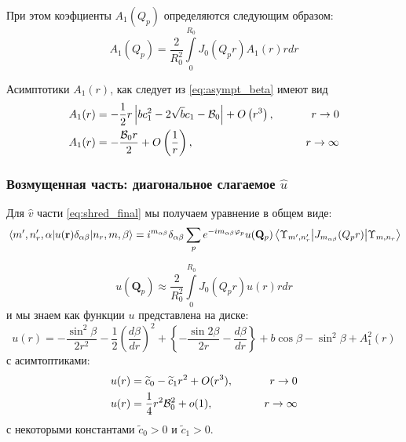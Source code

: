 \documentclass[a4paper,article,14pt]{extarticle}
\begin{document}
При этом коэфциенты $A_{1} (Q_p)$ определяются следующим образом:
\begin{equation}
\label{eq:fourier_v}
A_{1} (Q_p) = \frac{2}{R_0^2}  \int\limits_{0}^{R_0}  J_{0} (Q_p r ) A_1(r) r dr 
\end{equation} 

Асимптотики $A_1(r)$, как следует из \eqref{eq:asympt_beta} имеют вид
\begin{equation}
\begin{aligned}
A_1(r) &= -\frac{1}{2} r \left|b c_1^2-2 \sqrt{b} c_1-{\cal{B}}_0\right|+O\left(r^3\right), \qquad &r \rightarrow 0 \\
A_1(r) &= -\frac{{\cal{B}}_0 r}{2}+O\left(\frac{1}{r}\right), \qquad &r \rightarrow \infty
\end{aligned}
\end{equation}
\subsubsection{Возмущенная часть: диагональное слагаемое $\hat u$}
Для  $\hat v$ части \eqref{eq:shred_final} мы получаем уравнение в общем виде:
\begin{equation}
\label{eq:final_u}
\mel{m', n'_r,\alpha} {u(\mathbf{r})  \delta_{\alpha \beta}}{n_r,m, \beta} = i^{m_{\alpha \beta} }  \delta_{\alpha \beta} \sum\limits_{p}      e^{- i m_{\alpha \beta} \varphi_p} u(\mathbf{Q}_p)\mel{\Upsilon_{m', n'_r}} {J_{m_{\alpha \beta}} (Q_p r) }{\Upsilon_{m, n_r}}
\end{equation}

\begin{equation}
\label{eq:fourier_u}
u (\mathbf{Q}_p) \approx \frac{2}{R_0^2}  \int\limits_{0}^{R_0}  J_0 (Q_p r ) u(r) r dr 
\end{equation} 
и мы знаем как функции $u$ представлена на диске:
\begin{equation}
u(r) = -\frac{\sin^2 \beta }{2r^2} - \frac{1}{2}\left( \frac{d\beta }{dr} \right)^2 +  \left\{  - \frac{\sin 2\beta }{2r}  - \frac{d\beta }{dr} \right\} + b\cos \beta - \sin ^ 2 \beta + A^2_1(r)
\end{equation}
с асимтоптиками:
\begin{equation}
\begin{aligned}
u(r) &= \widetilde{c}_0 - \widetilde{c}_1 r^2 + O(r^3), \qquad &r \rightarrow 0 \\
u(r) &= \frac{1}{4} r^2 {\cal{B}}_0^2 + o(1), \qquad &r \rightarrow \infty
\end{aligned}
\end{equation}
с некоторыми константами $\widetilde{c}_0 > 0$ и $\widetilde{c}_1 > 0$.
\end{document}
